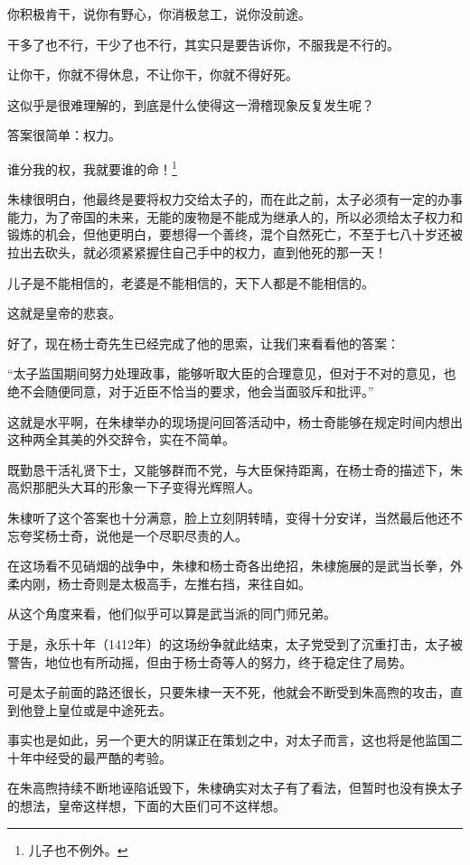 \begin{multicols}{\theparacolNo}
你积极肯干，说你有野心，你消极怠工，说你没前途。

干多了也不行，干少了也不行，其实只是要告诉你，不服我是不行的。

让你干，你就不得休息，不让你干，你就不得好死。

这似乎是很难理解的，到底是什么使得这一滑稽现象反复发生呢？

答案很简单：权力。

谁分我的权，我就要谁的命！\footnote{儿子也不例外。}

朱棣很明白，他最终是要将权力交给太子的，而在此之前，太子必须有一定的办事能力，为了帝国的未来，无能的废物是不能成为继承人的，所以必须给太子权力和锻炼的机会，但他更明白，要想得一个善终，混个自然死亡，不至于七八十岁还被拉出去砍头，就必须紧紧握住自己手中的权力，直到他死的那一天！

儿子是不能相信的，老婆是不能相信的，天下人都是不能相信的。

这就是皇帝的悲哀。

好了，现在杨士奇先生已经完成了他的思索，让我们来看看他的答案：

“太子监国期间努力处理政事，能够听取大臣的合理意见，但对于不对的意见，也绝不会随便同意，对于近臣不恰当的要求，他会当面驳斥和批评。”

这就是水平啊，在朱棣举办的现场提问回答活动中，杨士奇能够在规定时间内想出这种两全其美的外交辞令，实在不简单。

既勤恳干活礼贤下士，又能够群而不党，与大臣保持距离，在杨士奇的描述下，朱高炽那肥头大耳的形象一下子变得光辉照人。

朱棣听了这个答案也十分满意，脸上立刻阴转晴，变得十分安详，当然最后他还不忘夸奖杨士奇，说他是一个尽职尽责的人。

在这场看不见硝烟的战争中，朱棣和杨士奇各出绝招，朱棣施展的是武当长拳，外柔内刚，杨士奇则是太极高手，左推右挡，来往自如。

从这个角度来看，他们似乎可以算是武当派的同门师兄弟。

于是，永乐十年（1412年）的这场纷争就此结束，太子党受到了沉重打击，太子被警告，地位也有所动摇，但由于杨士奇等人的努力，终于稳定住了局势。

可是太子前面的路还很长，只要朱棣一天不死，他就会不断受到朱高煦的攻击，直到他登上皇位或是中途死去。

事实也是如此，另一个更大的阴谋正在策划之中，对太子而言，这也将是他监国二十年中经受的最严酷的考验。

在朱高煦持续不断地诬陷诋毁下，朱棣确实对太子有了看法，但暂时也没有换太子的想法，皇帝这样想，下面的大臣们可不这样想。


\end{multicols}
